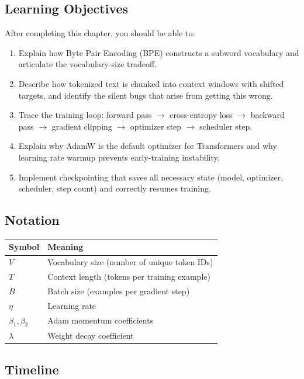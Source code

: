 \subsection*{Learning Objectives}

After completing this chapter, you should be able to:

\begin{enumerate}
  \item Explain how Byte Pair Encoding (BPE) constructs a subword vocabulary and articulate the vocabulary-size tradeoff.
  \item Describe how tokenized text is chunked into context windows with shifted targets, and identify the silent bugs that arise from getting this wrong.
  \item Trace the training loop: forward pass $\to$ cross-entropy loss $\to$ backward pass $\to$ gradient clipping $\to$ optimizer step $\to$ scheduler step.
  \item Explain why AdamW is the default optimizer for Transformers and why learning rate warmup prevents early-training instability.
  \item Implement checkpointing that saves all necessary state (model, optimizer, scheduler, step count) and correctly resumes training.
\end{enumerate}

\subsection*{Notation}

\begin{center}
\begin{tabular}{ll}
\toprule
Symbol & Meaning \\
\midrule
$V$ & Vocabulary size (number of unique token IDs) \\
$T$ & Context length (tokens per training example) \\
$B$ & Batch size (examples per gradient step) \\
$\eta$ & Learning rate \\
$\beta_1, \beta_2$ & Adam momentum coefficients \\
$\lambda$ & Weight decay coefficient \\
\bottomrule
\end{tabular}
\end{center}

\subsection*{Timeline}

